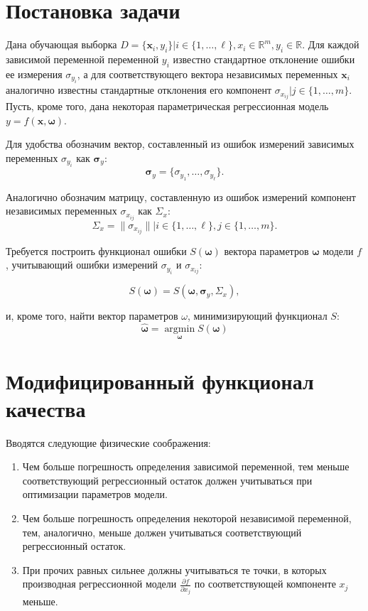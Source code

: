 \documentclass[11pt,a4paper]{article}
\newcommand{\bomega}{\boldsymbol{\omega}}
\begin{document}
\section{Постановка задачи}

Дана обучающая выборка $D = \{ \mathbf{x}_i, y_i \} | i \in \{ 1, \dots, \ell \}, x_i \in \mathbb{R}^m, y_i \in \mathbb{R}$.
Для каждой зависимой переменной переменной $y_i$ известно
стандартное отклонение ошибки ее измерения $\sigma_{y_i}$, а для соответствующего
вектора независимых переменных $\mathbf{x}_i$ аналогично известны стандартные
отклонения его компонент $\sigma_{x_{ij}} | j \in \{ 1, \dots, m \}$.
Пусть, кроме того, дана некоторая параметрическая регрессионная модель
$y = f (\mathbf{x}, \bomega)$.

Для удобства обозначим вектор, составленный из ошибок измерений зависимых переменных
$\sigma_{y_i}$ как $\boldsymbol{\sigma}_y$:
\[
  \boldsymbol{\sigma}_y = \{ \sigma_{y_1}, \dots, \sigma_{y_{\ell}} \}.
\]

Аналогично обозначим матрицу, составленную из ошибок измерений компонент
независимых переменных $\sigma_{x_{ij}}$ как $\Sigma_x$:
\[
  \Sigma_x = \| \sigma_{x_{ij}} \| | i \in \{ 1, \dots, \ell \}, j \in \{ 1, \dots, m \}.
\]

Требуется построить функционал ошибки $S(\bomega)$ вектора параметров
$\bomega$ модели $f$, учитывающий ошибки измерений $\sigma_{y_i}$ и
$\sigma_{x_{ij}}$:

\begin{equation}
  S(\bomega) = S(\bomega, \boldsymbol{\sigma}_y, \Sigma_x),
\end{equation}

и, кроме того, найти вектор параметров $\omega$, минимизирующий функционал
$S$:
\begin{equation}
  \hat{\bomega} = \mathop{\arg \min}\limits_{\bomega} S(\bomega)
\end{equation}

\section{Модифицированный функционал качества}

Вводятся следующие физические соображения:
\begin{enumerate}
  \item Чем больше погрешность определения зависимой переменной, тем меньше соответствующий
	регрессионный остаток должен учитываться при оптимизации параметров модели.
  \item Чем больше погрешность определения некоторой независимой переменной, тем,
	аналогично, меньше должен учитываться соответствующий регрессионный остаток.
  \item При прочих равных сильнее должны учитываться те точки, в которых производная
	регрессионной модели $\frac{\partial f}{\partial x_j}$ по соответствующей компоненте
	$x_j$ меньше.
\end{enumerate}
\end{document}
